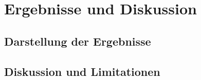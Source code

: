 \chapter{Ergebnisse und Diskussion}
\label{cap:Ergebnisse}

\section{Darstellung der Ergebnisse}
\label{sec:Darstellung_Ergebnisse}

\section{Diskussion und Limitationen}
\label{sec:Diskussion}
